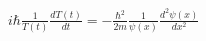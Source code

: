 \documentclass[preview]{standalone}
\begin{document}
\begin{center}
$i\hbar \frac{1}{T(t)} \frac{dT(t)}{dt} = -\frac{\hbar^2}{2m} \frac{1}{\psi(x)} \frac{d^2 \psi(x)}{dx^2}$
\end{center}
\end{document}
